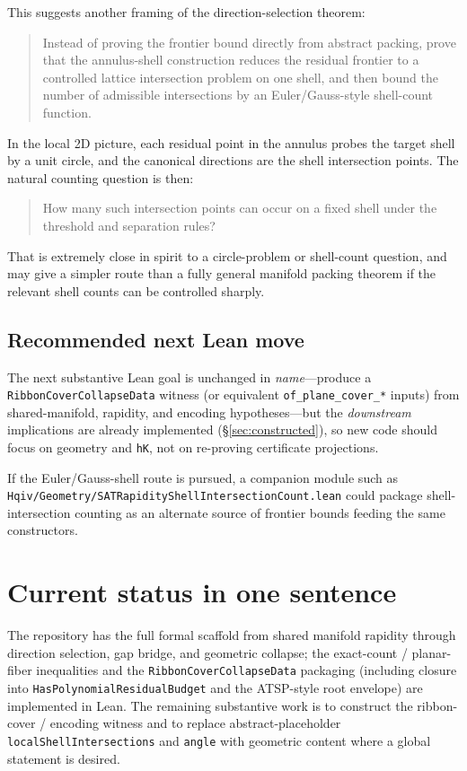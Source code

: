 \documentclass[11pt]{article}
\begin{document}
This suggests another framing of the direction-selection theorem:

\begin{quote}
Instead of proving the frontier bound directly from abstract packing, prove that the annulus-shell
construction reduces the residual frontier to a controlled lattice intersection problem on one shell,
and then bound the number of admissible intersections by an Euler/Gauss-style shell-count function.
\end{quote}

In the local 2D picture, each residual point in the annulus probes the target shell by a unit circle,
and the canonical directions are the shell intersection points. The natural counting question is then:

\begin{quote}
How many such intersection points can occur on a fixed shell under the threshold and separation rules?
\end{quote}

That is extremely close in spirit to a circle-problem or shell-count question, and may give a simpler
route than a fully general manifold packing theorem if the relevant shell counts can be controlled sharply.

\subsection*{Recommended next Lean move}

The next substantive Lean goal is unchanged in \emph{name}---produce a
\texttt{RibbonCoverCollapseData} witness (or equivalent \texttt{of\_plane\_cover\_*} inputs) from
shared-manifold, rapidity, and encoding hypotheses---but the \emph{downstream} implications are already
implemented (\S\ref{sec:constructed}), so new code should focus on geometry and \texttt{hK}, not on
re-proving certificate projections.

If the Euler/Gauss-shell route is pursued, a companion module such as
\texttt{Hqiv/Geometry/SATRapidityShellIntersectionCount.lean} could package shell-intersection counting as an
alternate source of frontier bounds feeding the same constructors.

\section{Current status in one sentence}

The repository has the full formal scaffold from shared manifold rapidity through direction selection,
gap bridge, and geometric collapse; the exact-count / planar-fiber inequalities and the
\texttt{RibbonCoverCollapseData} packaging (including closure into \texttt{HasPolynomialResidualBudget}
and the ATSP-style root envelope) are implemented in Lean. The remaining substantive work is to
construct the ribbon-cover / encoding witness and to replace abstract-placeholder \texttt{localShellIntersections}
and \texttt{angle} with geometric content where a global statement is desired.
\end{document}
